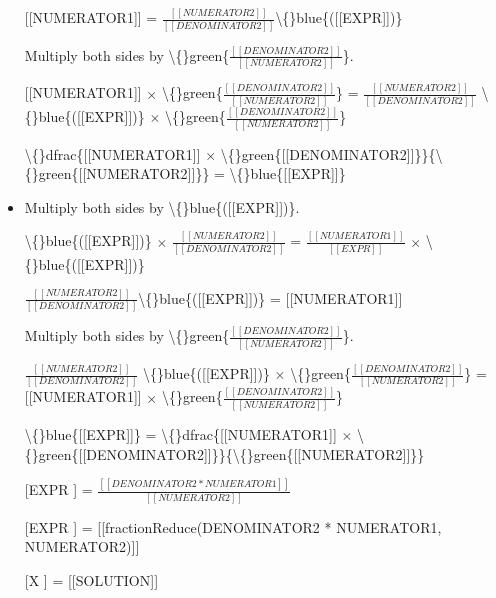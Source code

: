 \documentclass{article}
\begin{document}
\begin{itemize}
                        
                        
                            [[NUMERATOR1]] = $\frac{[[NUMERATOR2]]}{[[DENOMINATOR2]]}$\textbackslash\{\}blue\{([[EXPR]])\}
                        
                        
                            Multiply both sides by \textbackslash\{\}green\{$\frac{[[DENOMINATOR2]]}{[[NUMERATOR2]]}$\}.
                            
                                [[NUMERATOR1]] $\times$ \textbackslash\{\}green\{$\frac{[[DENOMINATOR2]]}{[[NUMERATOR2]]}$\} = 
                                $\frac{[[NUMERATOR2]]}{[[DENOMINATOR2]]}$ \textbackslash\{\}blue\{([[EXPR]])\} $\times$ 
                                \textbackslash\{\}green\{$\frac{[[DENOMINATOR2]]}{[[NUMERATOR2]]}$\}
                            
                        
                        
                            \textbackslash\{\}dfrac\{[[NUMERATOR1]] $\times$ \textbackslash\{\}green\{[[DENOMINATOR2]]\}\}\{\textbackslash\{\}green\{[[NUMERATOR2]]\}\} =
                            \textbackslash\{\}blue\{[[EXPR]]\}
  \item Multiply both sides by \textbackslash\{\}blue\{([[EXPR]])\}.
                            
                                \textbackslash\{\}blue\{([[EXPR]])\} $\times$ $\frac{[[NUMERATOR2]]}{[[DENOMINATOR2]]}$ =
                                $\frac{[[NUMERATOR1]]}{[[EXPR]]}$ $\times$ \textbackslash\{\}blue\{([[EXPR]])\}
                            
                        
                        
                            $\frac{[[NUMERATOR2]]}{[[DENOMINATOR2]]}$\textbackslash\{\}blue\{([[EXPR]])\} = [[NUMERATOR1]]
                        
                        
                            Multiply both sides by \textbackslash\{\}green\{$\frac{[[DENOMINATOR2]]}{[[NUMERATOR2]]}$\}.
                            
                                $\frac{[[NUMERATOR2]]}{[[DENOMINATOR2]]}$ \textbackslash\{\}blue\{([[EXPR]])\} $\times$ 
                                \textbackslash\{\}green\{$\frac{[[DENOMINATOR2]]}{[[NUMERATOR2]]}$\} =
                                [[NUMERATOR1]] $\times$ \textbackslash\{\}green\{$\frac{[[DENOMINATOR2]]}{[[NUMERATOR2]]}$\}
                            
                        
                        
                            \textbackslash\{\}blue\{[[EXPR]]\} = 
                            \textbackslash\{\}dfrac\{[[NUMERATOR1]] $\times$ \textbackslash\{\}green\{[[DENOMINATOR2]]\}\}\{\textbackslash\{\}green\{[[NUMERATOR2]]\}\}
  \item [[EXPR]] = $\frac{[[DENOMINATOR2 * NUMERATOR1]]}{[[NUMERATOR2]]}$
  \item [[EXPR]] = [[fractionReduce(DENOMINATOR2 * NUMERATOR1, NUMERATOR2)]]
  \item [[X]] = [[SOLUTION]]
\end{itemize}
\end{document}

